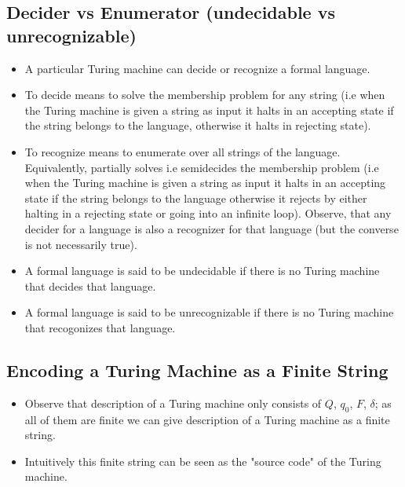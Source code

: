\documentclass[
11pt,notheorems,hyperref={pdfauthor=whatever}
]{beamer}
\begin{document}
\subsection{Decider vs Enumerator (undecidable vs unrecognizable)}
\begin{frame}
\begin{itemize}
    \setlength\itemsep{1em}
    \item A particular Turing machine can decide or recognize a formal language.
    \item To decide means to solve the membership problem for any string (i.e when the Turing machine is given a string as input it halts in an accepting state if the string belongs to the language, otherwise it halts in rejecting state).
    \item To recognize means to enumerate over all strings of the language. Equivalently, partially solves i.e semidecides the membership problem (i.e when the Turing machine is given a string as input it halts in an accepting state if the string belongs to the language otherwise it rejects by either halting in a rejecting state or going into an infinite loop). Observe, that any decider for a language is also a recognizer for that language (but the converse is not necessarily true).
    \item A formal language is said to be undecidable if there is no Turing machine that decides that language.
    \item A formal language is said to be unrecognizable if there is no Turing machine that recogonizes that language.
\end{itemize}
\end{frame}

\subsection{Encoding a Turing Machine as a Finite String}
\begin{frame}
\begin{itemize}
    \setlength\itemsep{3em}
    \item Observe that description of a Turing machine only consists of $Q$, $q_0$, $F$, $\delta$; as all of them are finite we can give description of a Turing machine as a finite string.
    \item Intuitively this finite string can be seen as the "source code" of the Turing machine.
\end{itemize}
\end{frame}
\end{document}

